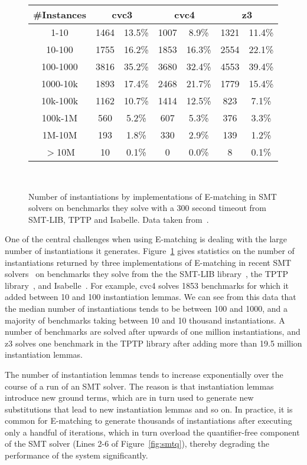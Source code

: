 \documentclass[oribibl]{llncs}
\begin{document}
\begin{figure}[t]
\centering
{
\begin{tabular}{|c|cc|cc|cc|}      
\hline                                                                      
\#Instances & \multicolumn{2}{c|}{{\bf cvc3}} & \multicolumn{2}{c|}{{\bf cvc4}} & \multicolumn{2}{c|}{{\bf z3}} \\
\hline   
1-10 & 1464 & 13.5\% & 1007 & 8.9\% & 1321 & 11.4\% \\
10-100 & 1755 & 16.2\% & 1853 & 16.3\% & 2554 & 22.1\% \\
100-1000 & 3816 & 35.2\% & 3680 & 32.4\% & 4553 & 39.4\% \\
1000-10k & 1893 & 17.4\% & 2468 & 21.7\% & 1779 & 15.4\% \\
10k-100k & 1162 & 10.7\% & 1414 & 12.5\% & 823 & 7.1\% \\
100k-1M & 560 & 5.2\% & 607 & 5.3\% & 376 & 3.3\% \\
1M-10M & 193 & 1.8\% & 330 & 2.9\% & 139 & 1.2\% \\
$>$10M & 10 & 0.1\% & 0 & 0.0\% & 8 & 0.1\%  \\                           
\hline                                                                
\end{tabular}
\\
}
\caption{Number of instantiations by implementations of E-matching in SMT solvers
on benchmarks they solve with a 300 second timeout from SMT-LIB, TPTP and Isabelle. Data taken from~\cite{}.}
\label{fig:results-inst}
\end{figure}

One of the central challenges when using E-matching is dealing with the large number of instantiations it generates.
Figure~\ref{fig:results-inst} gives statistics on the number of instantiations returned by three implementations of E-matching in recent SMT solvers~\cite{}
on benchmarks they solve from the the SMT-LIB library~\cite{}, the TPTP library~\cite{}, and Isabelle~\cite{}.
For example, cvc4 solves 1853 benchmarks for which it added between 10 and 100 instantiation lemmas.
We can see from this data that the median number of instantiations tends to be between 100 and 1000,
and a majority of benchmarks taking between 10 and 10 thousand instantiations.
A number of benchmarks are solved after upwards of one million instantiations,
and z3 solves one benchmark in the TPTP library after adding more than 19.5 million instantiation lemmas.

The number of instantiation lemmas tends to increase exponentially over the course of a run of an SMT solver.
The reason is that instantiation lemmas introduce new ground terms, which are in turn used to generate new substitutions that lead to
new instantiation lemmas and so on.
In practice, it is common for E-matching to generate thousands of instantiations after executing only a handful of iterations,
which in turn overload the quantifier-free component of the SMT solver (Lines 2-6 of Figure~\ref{fig:smtq}),
thereby degrading the performance of the system significantly.
\end{document}

